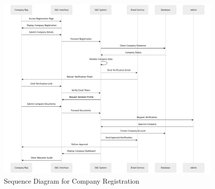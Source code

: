 \begin{figure}[H]
    \begin{center}
        \includegraphics[width=1\linewidth]{JhaBhatiaSharma/Images/Sequence Diagrams/CompanyRegistration.png}
        \caption{Sequence Diagram for Company Registration}
        \label{fig:signup_as_ST_seqd}%
    \end{center}
\end{figure}

